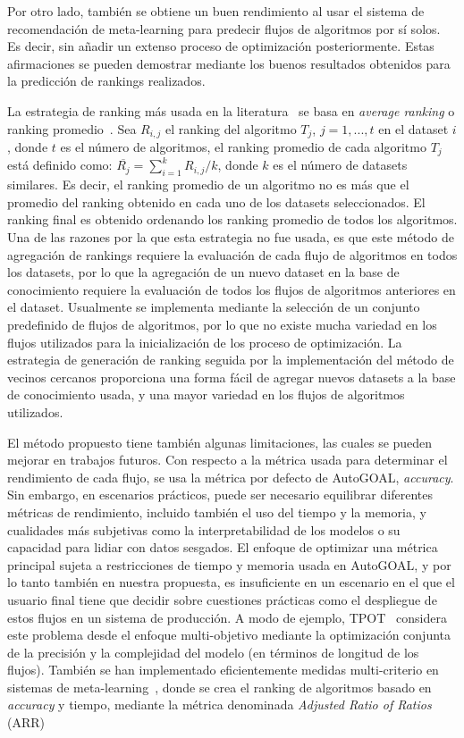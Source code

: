 Por otro lado, también se obtiene un buen rendimiento al usar el sistema de recomendación de meta-learning para predecir flujos de algoritmos por sí solos. Es decir, sin añadir un extenso proceso de optimización posteriormente. Estas afirmaciones se pueden demostrar mediante los buenos resultados obtenidos para la predicción de rankings realizados.

La estrategia de ranking más usada en la literatura~\cite{fuerer2015efficient, sun2014MetaLearningAT, bradzil2009metalearning} se basa en \textit{average ranking} o ranking promedio~\cite{bradzil2009metalearning}. Sea $R_{i,j}$ el ranking del algoritmo $T_{j}$, $j=1,...,t$ en el dataset $i$, donde $t$ es el número de algoritmos, el ranking promedio de cada algoritmo $T_{j}$ está definido como: $\overline{R_{j}} = \sum^{k}_{i=1}R_{i,j} / k$, donde $k$ es el número de datasets similares. Es decir, el ranking promedio de un algoritmo no es más que el promedio del ranking obtenido en cada uno de los datasets seleccionados. El ranking final es obtenido ordenando los ranking promedio de todos los algoritmos. Una de las razones por la que esta estrategia no fue usada, es que este método de agregación de rankings requiere la evaluación de cada flujo de algoritmos en todos los datasets, por lo que la agregación de un nuevo dataset en la base de conocimiento requiere la evaluación de todos los flujos de algoritmos anteriores en el dataset. Usualmente se implementa mediante la selección de un conjunto predefinido de flujos de algoritmos, por lo que no existe mucha variedad en los flujos utilizados para la inicialización de los proceso de optimización. La estrategia de generación de ranking seguida por la implementación del método de vecinos cercanos proporciona una forma fácil de agregar nuevos datasets a la base de conocimiento usada, y una mayor variedad en los flujos de algoritmos utilizados.

El método propuesto tiene también algunas limitaciones, las cuales se pueden mejorar en trabajos futuros. Con respecto a la métrica usada para determinar el rendimiento de cada flujo, se usa la métrica por defecto de AutoGOAL, \textit{accuracy}. Sin embargo, en escenarios prácticos, puede ser necesario equilibrar diferentes métricas de rendimiento, incluido también el uso del tiempo y la memoria, y cualidades más subjetivas como la interpretabilidad de los modelos o su capacidad para lidiar con datos sesgados. El enfoque de optimizar una métrica principal sujeta a restricciones de tiempo y memoria usada en AutoGOAL, y por lo tanto también en nuestra propuesta, es insuficiente en un escenario en el que el usuario final tiene que decidir sobre cuestiones prácticas como el despliegue de estos flujos en un sistema de producción. A modo de ejemplo, TPOT~\cite{olson2019tpot} considera este problema desde el enfoque multi-objetivo mediante la optimización conjunta de la precisión y la complejidad del modelo (en términos de longitud de los flujos). También se han implementado eficientemente medidas multi-criterio en sistemas de meta-learning~\cite{bradzil2003ranking}, donde se crea el ranking de algoritmos basado en \textit{accuracy} y tiempo, mediante la métrica denominada \textit{Adjusted Ratio of Ratios} (ARR)~\cite{soares2000measures}

